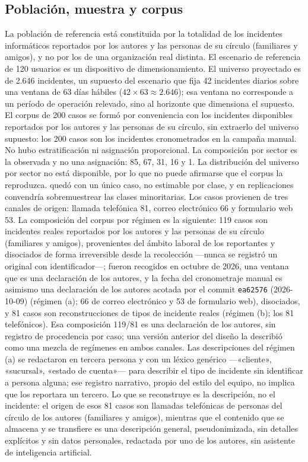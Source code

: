 \subsection{Población, muestra y corpus}\label{subsec:poblacion-muestra-corpus}

La población de referencia está constituida por la totalidad de los incidentes informáticos reportados por los autores y las personas de su círculo (familiares y amigos), y no por los de una organización real distinta. El escenario de referencia de 120 usuarios es un dispositivo de dimensionamiento. El universo proyectado es de 2.646 incidentes, un supuesto del escenario que fija 42 incidentes diarios sobre una ventana de 63 días hábiles (\(42 \times 63 \approx 2.646\)); esa ventana no corresponde a un período de operación relevado, sino al horizonte que dimensiona el supuesto. El corpus de 200 casos se formó por conveniencia con los incidentes disponibles reportados por los autores y las personas de su círculo, sin extraerlo del universo supuesto: los 200 casos son los incidentes cronometrados en la campaña manual. No hubo estratificación ni asignación proporcional. La composición por sector es la observada y no una asignación:  85,  67,  31,  16 y  1. La distribución del universo por sector no está disponible, por lo que no puede afirmarse que el corpus la reproduzca.  quedó con un único caso, no estimable por clase, y en replicaciones convendría sobremuestrear las clases minoritarias. Los casos provienen de tres canales de origen: llamada telefónica 81, correo electrónico 66 y formulario web 53. La composición del corpus por régimen es la siguiente: 119 casos son incidentes reales reportados por los autores y las personas de su círculo (familiares y amigos), provenientes del ámbito laboral de los reportantes y disociados de forma irreversible desde la recolección ---nunca se registró un original con identificador---; fueron recogidos en octubre de 2026, una ventana que es una declaración de los autores, y la fecha del cronometraje manual es asimismo una declaración de los autores acotada por el commit \texttt{ea62576} (2026-10-09) (régimen (a); 66 de correo electrónico y 53 de formulario web), disociados, y 81 casos son reconstrucciones de tipos de incidente reales (régimen (b); los 81 telefónicos). Esa composición 119/81 es una declaración de los autores, sin registro de procedencia por caso; una versión anterior del diseño la describió como una mezcla de regímenes en ambos canales. Las descripciones del régimen (a) se redactaron en tercera persona y con un léxico genérico ---«cliente», «sucursal», «estado de cuenta»--- para describir el tipo de incidente sin identificar a persona alguna; ese registro narrativo, propio del estilo del equipo, no implica que los reportara un tercero. Lo que se reconstruye es la descripción, no el incidente: el origen de esos 81 casos son llamadas telefónicas de personas del círculo de los autores (familiares y amigos), mientras que el contenido que se almacena y se transfiere es una descripción general, pseudonimizada, sin detalles explícitos y sin datos personales, redactada por uno de los autores, sin asistente de inteligencia artificial. 